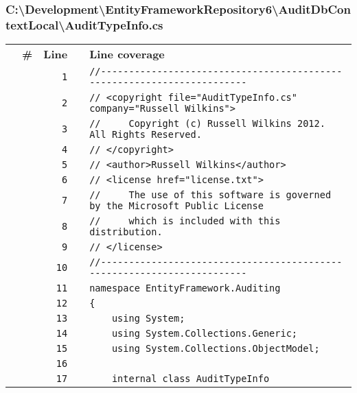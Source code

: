\documentclass[a4paper,10pt]{article}
\begin{document}
\subsubsection{C:\textbackslash Development\textbackslash EntityFrameworkRepository6\textbackslash AuditDbContextLocal\textbackslash AuditTypeInfo.cs}
\begin{longtable}[l]{lrrll}
\textbf{} & \textbf{\#} & \textbf{Line} & \textbf{} & \textbf{Line coverage}\\
\cellcolor{gray} &  & \verb~1~ & & \verb~//-----------------------------------------------------------------------~\\
\cellcolor{gray} &  & \verb~2~ & & \verb~// <copyright file="AuditTypeInfo.cs" company="Russell Wilkins">~\\
\cellcolor{gray} &  & \verb~3~ & & \verb~//     Copyright (c) Russell Wilkins 2012. All Rights Reserved.~\\
\cellcolor{gray} &  & \verb~4~ & & \verb~// </copyright>~\\
\cellcolor{gray} &  & \verb~5~ & & \verb~// <author>Russell Wilkins</author>~\\
\cellcolor{gray} &  & \verb~6~ & & \verb~// <license href="license.txt">~\\
\cellcolor{gray} &  & \verb~7~ & & \verb~//     The use of this software is governed by the Microsoft Public License~\\
\cellcolor{gray} &  & \verb~8~ & & \verb~//     which is included with this distribution.~\\
\cellcolor{gray} &  & \verb~9~ & & \verb~// </license>~\\
\cellcolor{gray} &  & \verb~10~ & & \verb~//-----------------------------------------------------------------------~\\
\cellcolor{gray} &  & \verb~11~ & & \verb~namespace EntityFramework.Auditing~\\
\cellcolor{gray} &  & \verb~12~ & & \verb~{~\\
\cellcolor{gray} &  & \verb~13~ & & \verb~    using System;~\\
\cellcolor{gray} &  & \verb~14~ & & \verb~    using System.Collections.Generic;~\\
\cellcolor{gray} &  & \verb~15~ & & \verb~    using System.Collections.ObjectModel;~\\
\cellcolor{gray} &  & \verb~16~ & & \verb~~\\
\cellcolor{gray} &  & \verb~17~ & & \verb~    internal class AuditTypeInfo~\\

\end{longtable}
\end{document}
